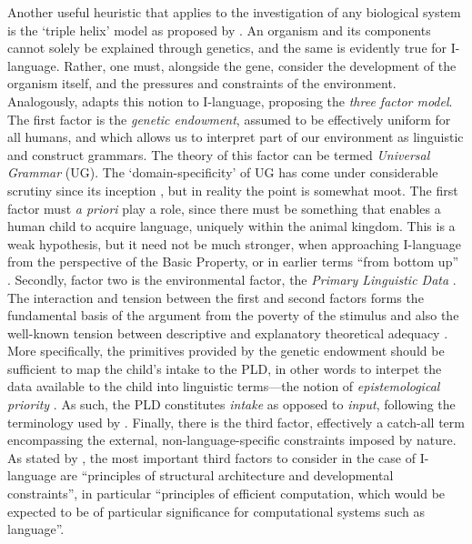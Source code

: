 Another useful heuristic that applies to the investigation of any biological system is the `triple helix' model as proposed by \textcite{LewontinRC_2000}. An organism and its components cannot solely be explained through genetics, and the same is evidently true for I-language. Rather, one must, alongside the gene, consider the development of the organism itself, and the pressures and constraints of the environment. Analogously, \textcite{ChomskyN_2005} adapts this notion to I-language, proposing the \textit{three factor model}. The first factor is the \textit{genetic endowment}, assumed to be effectively uniform for all humans, and which allows us to interpret part of our environment as linguistic and construct grammars. The theory of this factor can be termed \textit{Universal Grammar} (UG). The `domain-specificity' of UG has come under considerable scrutiny since its inception \parencite[e.g.][]{TomaselloM_2003}, but in reality the point is somewhat moot. The first factor must \textit{a priori} play a role, since there must be something that enables a human child to acquire language, uniquely within the animal kingdom. This is a weak hypothesis, but it need not be much stronger, when approaching I-language from the perspective of the Basic Property, or in earlier terms ``from bottom up'' \parencite[4]{ChomskyN_2007}. Secondly, factor two is the environmental factor, the \textit{Primary Linguistic Data} \parencite[PLD;][10]{ChomskyN_1981}. The interaction and tension between the first and second factors forms the fundamental basis of the argument from the poverty of the stimulus \parencite{ChomskyN_1980b, ChomskyN_1986a} and also the well-known tension between descriptive and explanatory theoretical adequacy \parencite{ChomskyN_1964,ChomskyN_1965}. More specifically, the primitives provided by the genetic endowment should be sufficient to map the child's intake to the PLD, in other words to interpet the data available to the child into linguistic terms---the notion of \textit{epistemological priority} \textcite[10]{ChomskyN_1981}. As such, the PLD constitutes \textit{intake} as opposed to \textit{input}, following the terminology used by \textcite{EversA.vanKampenJ_2008}. Finally, there is the third factor, effectively a catch-all term encompassing the external, non-language-specific constraints imposed by nature. As stated by \textcite[6]{ChomskyN_2005}, the most important third factors to consider in the case of I-language are ``principles of structural architecture and developmental constraints'', in particular ``principles of efficient computation, which would be expected to be of particular significance for computational systems such as language''.

